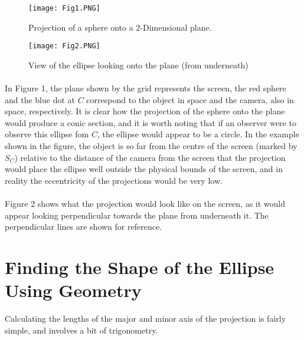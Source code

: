 \documentclass{article}
\newcommand\dd{{2-Dimensional}\xspace}
\begin{document}
	\begin{figure}
		\texttt{[image: Fig1.PNG]}
		\caption{Projection of a sphere onto a \dd plane.}
		\texttt{[image: Fig2.PNG]}
		\caption{View of the ellipse looking onto the plane (from underneath)}
	\end{figure}

	\paragraph{}
	In Figure 1, the plane shown by the grid represents the screen, the red sphere and the blue dot at $C$ correspond to the object in space and 
	the camera, also in space, respectively. It is clear how the projection of the sphere onto the plane would produce a conic section, and it is 
	worth noting that if an observer were to observe this ellipse fom $C$, the ellipse would appear to be a circle. In the example shown in the 
	figure, the object is so far from the centre of the screen (marked by $S_C$) relative to the distance of the camera from the screen that the 
	projection would place the ellipse well outside the physical bounds of the screen, and in reality the eccentricity of the projections would be very 	low. 
	\paragraph{}
	Figure 2 shows what the projection would look like on the screen, as it would appear looking perpendicular towards the plane from 	
	underneath it. The perpendicular lines are shown for reference.
	

\section{Finding the Shape of the Ellipse Using Geometry}
	Calculating the lengths of the major and minor axis of the projection is fairly simple, and involves a bit of trigonometry. 
\end{document}
